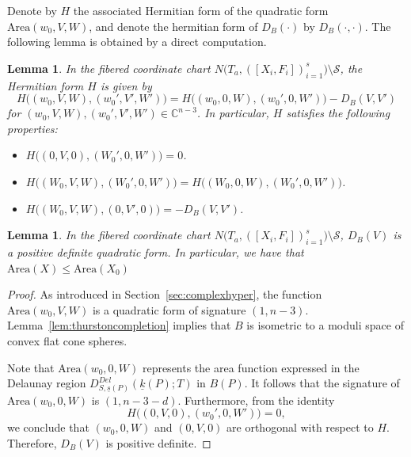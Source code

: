 \documentclass{compositio}
\numberwithin{equation}{section}
\numberwithin{figure}{section}
\theoremstyle{definition}
\theoremstyle{plain}
\newtheorem{lemma}[definition]{Lemma}
\begin{document}
{Denote by $H$ the associated Hermitian form of the quadratic form $\mathrm{Area}(w_0,V,W)$, and denote the hermitian form of $D_B(\cdot)$ by $D_B(\cdot,\cdot)$. The following lemma is obtained by a direct computation.

\begin{lemma}\label{lem:fibereareahermitian}
In the fibered coordinate chart $N\big(T_a, ([X_i, F_i])_{i=1}^s\big) \setminus \mathcal{S}$, the Hermitian form $H$ is given by
$$
H\big((w_0, V, W), (w_0', V', W')\big) = H\big((w_0, 0, W), (w_0', 0, W')\big) - D_B(V, V')
$$
for $(w_0, V, W), (w_0', V', W') \in \mathbb{C}^{n-3}$. In particular, $H$ satisfies the following properties:
    \begin{itemize}
        \item $H\big((0,V,0),(W_0',0,W')\big) = 0$.
        \item $H\big((W_0,V,W),(W_0',0,W')\big) = H\big((W_0,0,W),(W_0',0,W')\big)$.
        \item $H\big((W_0,V,W),(0,V',0)\big) = -D_B(V,V')$.
    \end{itemize}
\end{lemma}

\begin{lemma}\label{lem:bv}
In the fibered coordinate chart $N\big(T_a, ([X_i, F_i])_{i=1}^s\big) \setminus \mathcal{S}$, $D_B(V)$ is a positive definite quadratic form. In particular, we have that $\mathrm{Area}(X)\le \mathrm{Area}(X_0)$
\end{lemma}

\begin{proof}
    As introduced in Section~\ref{sec:complexhyper}, the function $\mathrm{Area}(w_0, V, W)$ is a quadratic form of signature $(1, n-3)$. Lemma~\ref{lem:thurstoncompletion} implies that $B$ is isometric to a moduli space of convex flat cone spheres. 

    Note that $\mathrm{Area}(w_0, 0, W)$ represents the area function expressed in the Delaunay region $D_{S,\underline{s}(P)}^{Del}(\underline{k}(P);T)$ in $B(P)$. It follows that the signature of $\mathrm{Area}(w_0, 0, W)$ is $(1, n-3-d)$. Furthermore, from the identity
    $$
    H\big((0, V, 0), (w_0', 0, W')\big) = 0,
    $$
    we conclude that $(w_0, 0, W)$ and $(0, V, 0)$ are orthogonal with respect to $H$. Therefore, $D_B(V)$ is positive definite.
\end{proof}

}
\end{document}
